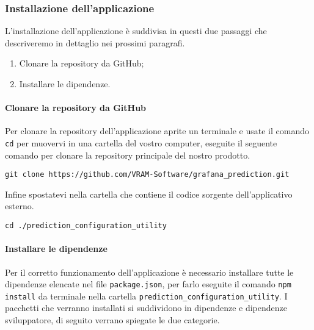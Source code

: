 \subsubsection{Installazione dell'applicazione}
L'installazione dell'applicazione è suddivisa in questi due passaggi che descriveremo in dettaglio nei prossimi paragrafi.
\begin{enumerate}
    \item Clonare la repository da GitHub;
    \item Installare le dipendenze.
\end{enumerate}

\paragraph{Clonare la repository da GitHub \\}
Per clonare la repository dell'applicazione aprite un terminale e usate il comando \texttt{cd} per muovervi in una cartella del vostro computer, eseguite il seguente comando per clonare la repository principale del nostro prodotto.
\begin{verbatim}
git clone https://github.com/VRAM-Software/grafana_prediction.git
\end{verbatim}
Infine spostatevi nella cartella che contiene il codice sorgente dell'applicativo esterno. 
\begin{verbatim}
cd ./prediction_configuration_utility
\end{verbatim}

\paragraph{Installare le dipendenze}
Per il corretto funzionamento dell'applicazione è necessario installare tutte le dipendenze elencate nel file \texttt{package.json}, per farlo eseguite il comando \texttt{npm install} da terminale nella cartella \verb|prediction_configuration_utility|. I pacchetti che verranno installati si suddividono in dipendenze e dipendenze sviluppatore, di seguito verrano spiegate le due categorie.


